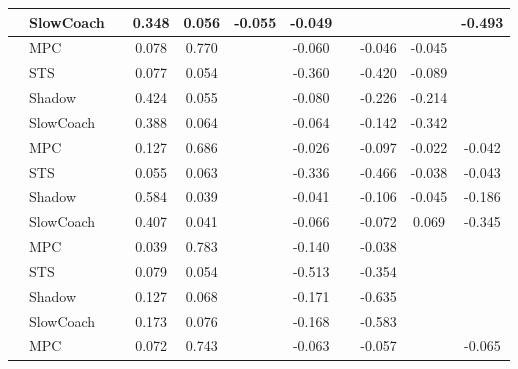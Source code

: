 \begin{tabular}{|l|l|*{9}{c|}}
                                                           & SlowCoach &       &     0.348 &     0.056 & -0.055 & -0.049 &     &      &      &   -0.493 \\
\midrule
[False, True, True, False, True, False, True, True, False] & MPC &       &     0.078 &     0.770 &     & -0.060 &     &  -0.046 &  -0.045 &       \\
                                                           & STS &       &     0.077 &     0.054 &     & -0.360 &     &  -0.420 &  -0.089 &       \\
                                                           & Shadow &       &     0.424 &     0.055 &     & -0.080 &     &  -0.226 &  -0.214 &       \\
                                                           & SlowCoach &       &     0.388 &     0.064 &     & -0.064 &     &  -0.142 &  -0.342 &       \\
\midrule
[False, True, True, False, True, False, True, True, True] & MPC &       &     0.127 &     0.686 &     & -0.026 &     &  -0.097 &  -0.022 &   -0.042 \\
                                                           & STS &       &     0.055 &     0.063 &     & -0.336 &     &  -0.466 &  -0.038 &   -0.043 \\
                                                           & Shadow &       &     0.584 &     0.039 &     & -0.041 &     &  -0.106 &  -0.045 &   -0.186 \\
                                                           & SlowCoach &       &     0.407 &     0.041 &     & -0.066 &     &  -0.072 &   0.069 &   -0.345 \\
\midrule
[False, True, True, False, True, False, True, False, False] & MPC &       &     0.039 &     0.783 &     & -0.140 &     &  -0.038 &      &       \\
                                                           & STS &       &     0.079 &     0.054 &     & -0.513 &     &  -0.354 &      &       \\
                                                           & Shadow &       &     0.127 &     0.068 &     & -0.171 &     &  -0.635 &      &       \\
                                                           & SlowCoach &       &     0.173 &     0.076 &     & -0.168 &     &  -0.583 &      &       \\
\midrule
[False, True, True, False, True, False, True, False, True] & MPC &       &     0.072 &     0.743 &     & -0.063 &     &  -0.057 &      &   -0.065 \\

\end{tabular}
